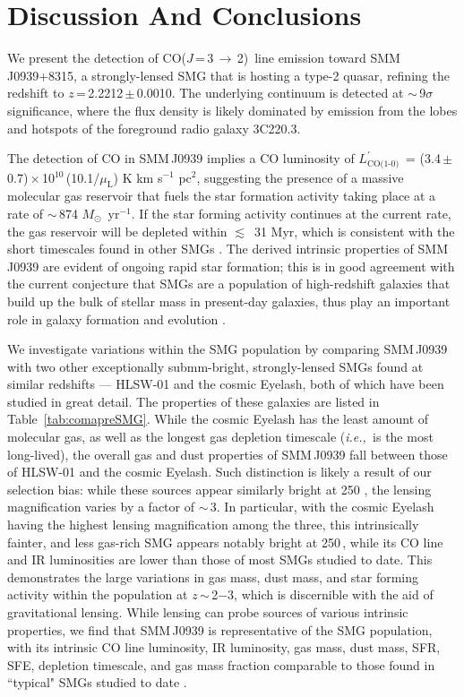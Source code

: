 \documentclass[iop]{emulateapj}
\newcommand{\Msun}{\mbox{$M_{\odot}$}}
\newcommand{\CO}{\mbox{CO($J$\,=\,3\,$\rightarrow$\,2) }}
\newcommand{\Lp}{\mbox{$L^{\prime}_\textrm{CO(1-0)}$}}
\newcommand{\LpU}{\mbox{K\,\,km\,\,s$^{-1}$\,\,pc$^2$}}
\newcommand{\eg}{{\sl e.g.,~}}
\newcommand{\ie}{{\sl i.e.,~}}
\newcommand{\pmOne}{\mbox{$^{-1}$}}
\begin{document}
\section{Discussion And Conclusions}

We present the detection of \CO line emission toward SMM\,J0939+8315, a strongly-lensed SMG that is hosting a type-2 quasar, refining the redshift
to $z$\,=\,2.2212\,$\pm$\,0.0010. The underlying continuum is detected at $\sim$\,9$\sigma$ significance, where the flux density is likely dominated by emission from the lobes and hotspots of the foreground radio galaxy 3C220.3.

The detection of CO in SMM\,J0939
implies a CO luminosity of \Lp\ = (3.4\,$\pm$\,0.7)\,$\times$\,10$^{10}$\,(10.1/$\mu_\textrm{L}$) \LpU, suggesting the presence of a massive
molecular gas reservoir that fuels the star formation activity taking place at a rate of $\sim$\,874 \Msun~yr\pmOne. If the star forming activity continues at the current rate, the gas reservoir will be depleted within $\lesssim$~31 Myr,
which is consistent with the short timescales found in other SMGs \citep{Greve05a}. The derived intrinsic properties of SMM\,J0939 are evident of ongoing rapid star formation; this is in good agreement with the current conjecture that SMGs are a 
population of high-redshift galaxies that build up the bulk of stellar mass in present-day galaxies, thus play an important role
in galaxy formation and evolution \citep[\eg ][]{Dickinson03a}.

We investigate variations within the SMG population by comparing SMM\,J0939 with two other exceptionally submm-bright,
strongly-lensed SMGs
found at similar redshifts --- HLSW-01 and the cosmic Eyelash, both of which have been studied in great detail. The properties
of these galaxies are listed in Table~\ref{tab:comapreSMG}. While the cosmic Eyelash has the least amount of molecular gas, as well as
the
longest gas depletion timescale (\ie is the most long-lived), the overall gas and dust properties of SMM\,J0939 fall between those of HLSW-01 and the
cosmic
Eyelash. Such distinction is likely a result of our selection bias: while these sources appear similarly bright at 250 \micron, the lensing magnification
varies by a factor of $\sim$\,3. In particular, with the cosmic Eyelash having the highest lensing magnification among the
three, this
intrinsically fainter, and less gas-rich SMG appears notably bright
at 250\,\micron, while its CO line and IR luminosities are lower than those of most SMGs studied to date.
This demonstrates
the large variations in gas mass, dust mass, and star forming activity within the population at $z$\,$\sim$\,2$-$3, which is discernible with the aid of gravitational lensing.
While lensing can probe sources
of various intrinsic properties, we find that SMM\,J0939 is representative of the SMG population, with its intrinsic CO line luminosity, IR luminosity, gas mass,
dust mass, SFR, SFE, depletion timescale, and gas mass fraction comparable to those found in ``typical" SMGs studied to date
\citep[\eg ][]{Greve05a,Tacconi08a}.
\end{document}
